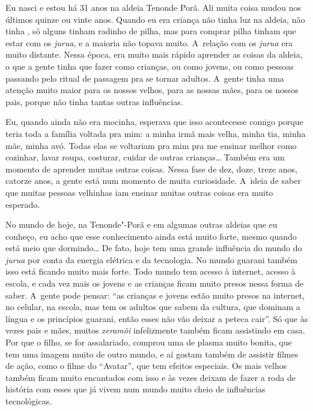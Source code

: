 Eu nasci e estou há 31 anos na aldeia Tenonde Porã. Ali muita coisa
mudou nos últimos quinze ou vinte anos. Quando eu era criança não tinha
luz na aldeia, não tinha , só alguns tinham radinho de pilha, mas
para comprar pilha tinham que estar com os \emph{jurua}, e a maioria não
topava muito. A~relação com os \emph{jurua} era muito distante. Nessa época,
era muito mais rápido aprender as coisas da aldeia, o que a gente tinha
que fazer como crianças, ou como jovens, ou como pessoas passando pelo
ritual de passagem pra se tornar adultos. A~gente tinha uma atenção
muito maior para os nossos velhos, para as nossas mães, para os nossos
pais, porque não tinha tantas outras influências.

Eu, quando ainda não era mocinha, esperava que isso acontecesse comigo
porque teria toda a família voltada pra mim: a minha irmã mais velha,
minha tia, minha mãe, minha avó. Todas elas se voltariam pra mim pra me
ensinar melhor como cozinhar, lavar roupa, costurar, cuidar de outras
crianças\ldots{} Também era um momento de aprender muitas outras coisas.
Nessa fase de dez, doze, treze anos, catorze anos, a gente está num
momento de muita curiosidade. A~ideia de saber que muitas pessoas
velhinhas iam ensinar muitas outras coisas era muito esperado.

No mundo de hoje, na Tenonde"-Porã e em algumas outras aldeias que eu
conheço, eu acho que esse conhecimento ainda está muito forte, mesmo
quando está meio que dormindo\ldots{} De fato, hoje tem uma grande
influência do mundo do \emph{jurua} por conta da energia elétrica e da
tecnologia. No mundo guarani também isso está ficando muito mais forte.
Todo mundo tem acesso à internet, acesso à escola, e cada vez mais os
jovens e as crianças ficam muito presos nessa forma de saber. A~gente
pode pensar: ``as crianças e jovens estão muito presos na internet, no
celular, na escola, mas tem os adultos que sabem da cultura, que
dominam a língua e os princípios guarani, então esses não vão deixar a
peteca cair''. Só que às vezes pais e mães, muitos \emph{xeramõi} infelizmente
também ficam assistindo  em casa. Por que o filho, se for
assalariado, comprou uma  de plasma muito bonita, que tem uma imagem
muito de outro mundo, e aí gostam também de assistir filmes de ação,
como o filme do ``Avatar'', que tem efeitos especiais. Os mais velhos
também ficam muito encantados com isso e às vezes deixam de fazer a
roda de história com esses que já vivem num mundo muito cheio de
influências tecnológicas. 

